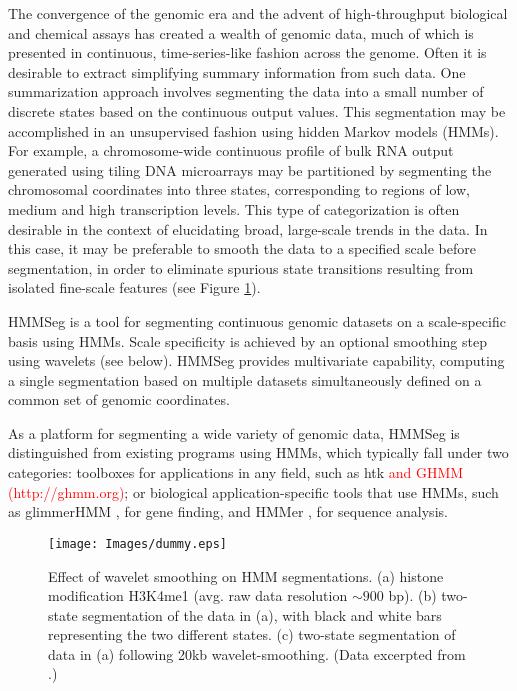 \documentclass{bioinfo}
\begin{document}
The convergence of the genomic era and the advent of
high-throughput biological and chemical assays has created a wealth of
genomic data, much of which is presented in continuous,
time-series-like fashion across the genome.  Often it is desirable to
extract simplifying summary information from such data.  One
summarization approach involves segmenting the data into a small
number of discrete states based on the continuous output values.  This
segmentation may be accomplished in an unsupervised fashion using
hidden Markov models (HMMs).  For example, a chromosome-wide
continuous profile of bulk RNA output generated using tiling DNA
microarrays may be partitioned by segmenting the chromosomal
coordinates into three states, corresponding to regions of low, medium
and high transcription levels.  This type of categorization is often
desirable in the context of elucidating broad, large-scale trends in
the data.  In this case, it may be preferable to smooth the data to a
specified scale before segmentation, in order to eliminate spurious
state transitions resulting from isolated fine-scale features (see
Figure \ref{scales}).

HMMSeg is a tool for segmenting continuous genomic datasets on a
scale-specific basis using HMMs.  Scale specificity is achieved by an
optional smoothing step using wavelets (see below).  HMMSeg provides
multivariate capability, computing a single segmentation based on
multiple datasets simultaneously defined on a common set of genomic
coordinates.  

As a platform for segmenting a wide variety of genomic data, HMMSeg is
distinguished from existing programs using HMMs, which typically fall
under two categories: toolboxes for applications in any field, such as
htk \citep{young:htk} \textcolor{red}{and GHMM (http://ghmm.org)}; or
biological application-specific tools that use HMMs, such as
glimmerHMM \citep{majoros:tigrscan}, for gene finding, and HMMer
\citep{eddy:hmmer}, for sequence analysis.


\begin{figure}
  \centering
  \texttt{[image: Images/dummy.eps]}
  \caption{Effect of wavelet smoothing on HMM segmentations.  (a)
  histone modification H3K4me1 (avg. raw data resolution $\sim900$
  bp).  (b) two-state segmentation of the data in (a), with black and
  white bars representing the two different states. (c) two-state
  segmentation of data in (a) following 20kb wavelet-smoothing. (Data
  excerpted from \citep{thurman:identification}.)}
  \label{scales}
\end{figure}
\end{document}

